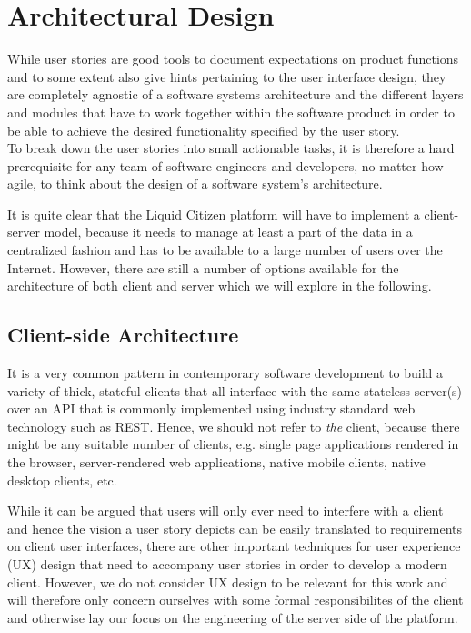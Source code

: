 \section{Architectural Design}
\label{sec:ArchitecturalDesign}

While user stories are good tools to document expectations on product functions and to some extent also give hints pertaining to the user interface design, they are completely agnostic of a software systems architecture and the different layers and modules that have to work together within the software product in order to be able to achieve the desired functionality specified by the user story.\\
To break down the user stories into small actionable tasks, it is therefore a hard prerequisite for any team of software engineers and developers, no matter how agile, to think about the design of a software system's architecture.

It is quite clear that the Liquid Citizen platform will have to implement a client-server model, because it needs to manage at least a part of the data in a centralized fashion and has to be available to a large number of users over the Internet.
However, there are still a number of options available for the architecture of both client and server which we will explore in the following.

\subsection{Client-side Architecture}
\label{ssec:ClientSideArchitecture}
It is a very common pattern in contemporary software development to build a variety of thick, stateful clients that all interface with the same stateless server(s) over an API that is commonly implemented using industry standard web technology such as REST.
Hence, we should not refer to \textit{the} client, because there might be any suitable number of clients, e.g. single page applications rendered in the browser, server-rendered web applications, native mobile clients, native desktop clients, etc.

While it can be argued that users will only ever need to interfere with a client and hence the vision a user story depicts can be easily translated to requirements on client user interfaces, there are other important techniques for user experience (UX) design that need to accompany user stories in order to develop a modern client.
However, we do not consider UX design to be relevant for this work and will therefore only concern ourselves with some formal responsibilites of the client and otherwise lay our focus on the engineering of the server side of the platform.

